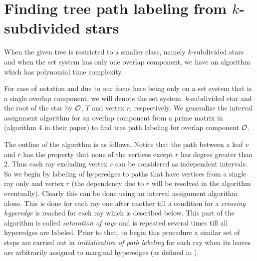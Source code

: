\documentclass{CRPITStyle} %
\renewcommand{\cite}{\citep}%
\def\cO{{\cal O}}
\def\xnoindent{} %
\begin{document}
\section{Finding tree path labeling from $k$-subdivided stars}
\label{sec:ksubdivstar}
 When the given tree is restricted to a smaller class,
namely $k$-subdivided stars and when the set system has only one
overlap component, we have an algorithm which has polynomial time
complexity.

\xnoindent For ease of notation and due to our focus here being only
on a set system that is a single overlap component, we will denote the
set system, $k$-subdivided star and the root of the star by $\cO$,
$T$ and vertex $r$, respectively. We generalize the interval
assignment algorithm for an overlap component from a prime matrix in
\cite{nsnrs09} (algorithm 4 in their paper) to find tree path labeling
for overlap component $\cO$.

\xnoindent The outline of the algorithm is as follows.   Notice that the path between a leaf $v$ and $r$ has the
property that none of the vertices except $r$ has degree greater than
$2$. Thus each ray excluding vertex $r$ can be considered as
independent intervals.  So we begin by labeling of hyperedges to paths
that have vertices from a single ray only and vertex $r$ (the
dependency due to $r$ will be resolved in the algorithm
eventually). Clearly this can be done using an interval assignment
algorithm alone. This is done for each ray one after another till a
condition for a {\em crossing hyperedge} is reached for each ray which
is described below. This part of the algorithm is called {\em
  saturation of rays} and is repeated several times till all
hyperedges are labeled. Prior to that, to begin this procedure a
similar set of steps are carried out in {\em initialization of path
  labeling} for each ray when its leaves are arbitrarily assigned to
marginal hyperedges (as defined in \cite{kklv10}).
\end{document}
